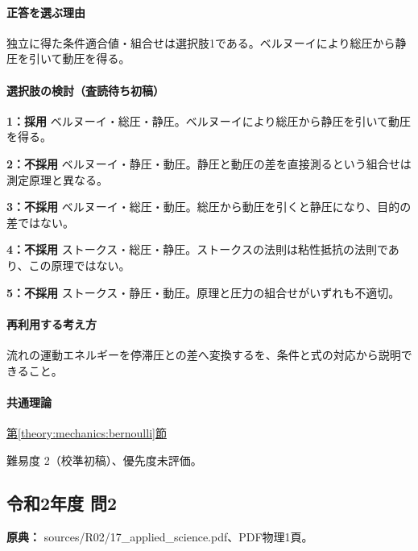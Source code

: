 \paragraph{正答を選ぶ理由} 独立に得た条件適合値・組合せは選択肢1である。ベルヌーイにより総圧から静圧を引いて動圧を得る。

\paragraph{選択肢の検討（査読待ち初稿）}\mbox{}\par

\noindent\textbf{1：採用} ベルヌーイ・総圧・静圧。ベルヌーイにより総圧から静圧を引いて動圧を得る。\par

\noindent\textbf{2：不採用} ベルヌーイ・静圧・動圧。静圧と動圧の差を直接測るという組合せは測定原理と異なる。\par

\noindent\textbf{3：不採用} ベルヌーイ・総圧・動圧。総圧から動圧を引くと静圧になり、目的の差ではない。\par

\noindent\textbf{4：不採用} ストークス・総圧・静圧。ストークスの法則は粘性抵抗の法則であり、この原理ではない。\par

\noindent\textbf{5：不採用} ストークス・静圧・動圧。原理と圧力の組合せがいずれも不適切。\par

\paragraph{再利用する考え方} 流れの運動エネルギーを停滞圧との差へ変換するを、条件と式の対応から説明できること。

\paragraph{共通理論} \hyperref[theory:mechanics:bernoulli]{第\ref*{theory:mechanics:bernoulli}節}

\par 難易度 2（校準初稿）、優先度未評価。

\subsection{令和2年度 問2}
\label{q:r02-reg-applied-02}

\noindent\textbf{原典：} sources/R02/17\_applied\_science.pdf、PDF物理1頁。

